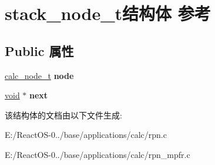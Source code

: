 \hypertarget{structstack__node__t}{}\section{stack\+\_\+node\+\_\+t结构体 参考}
\label{structstack__node__t}
\subsection*{Public 属性}
\begin{DoxyCompactItemize}
\item 
\mbox{\label{structstack__node__t_aeccda63b0605d0e230dd386bef2b0ccb}} 
\hyperlink{structcalc__node__t}{calc\+\_\+node\+\_\+t} {\bfseries node}
\item 
\mbox{\label{structstack__node__t_af0fba94f4869ccc02f4f9a0f9893a254}} 
\hyperlink{interfacevoid}{void} $\ast$ {\bfseries next}
\end{DoxyCompactItemize}


该结构体的文档由以下文件生成\+:\begin{DoxyCompactItemize}
\item 
E\+:/\+React\+O\+S-\/0../base/applications/calc/rpn.\+c\item 
E\+:/\+React\+O\+S-\/0../base/applications/calc/rpn\+\_\+mpfr.\+c\end{DoxyCompactItemize}
